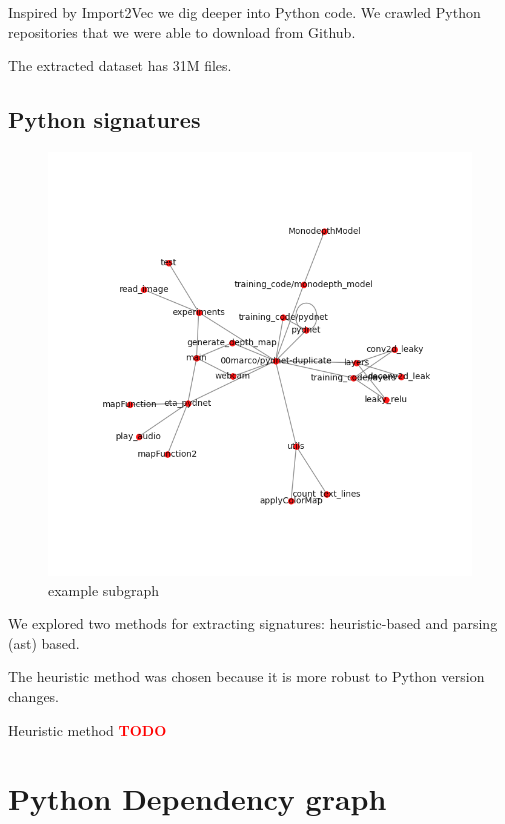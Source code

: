 \documentclass[longabstract,mgr,english]{iithesis}
\newcommand{\TODO}{\textcolor{red}{\huge{TODO}}}
\begin{document}
Inspired by Import2Vec we dig deeper into Python code. We crawled Python repositories that we were able to download from Github.

The extracted dataset has 31M files.

\subsection{Python signatures}


\begin{center}
\begin{figure}[h]
\centering
\includegraphics[scale=0.5]{./img/graph_plot.png}
\caption{example subgraph}
\end{figure}
\end{center}

We explored two methods for extracting signatures: heuristic-based and parsing (ast) based.

The heuristic method was chosen because it is more robust to Python version changes.

Heuristic method \textbf{\textcolor{red}{\TODO}}


\section{Python Dependency graph}
\label{python-graph}
\end{document}
